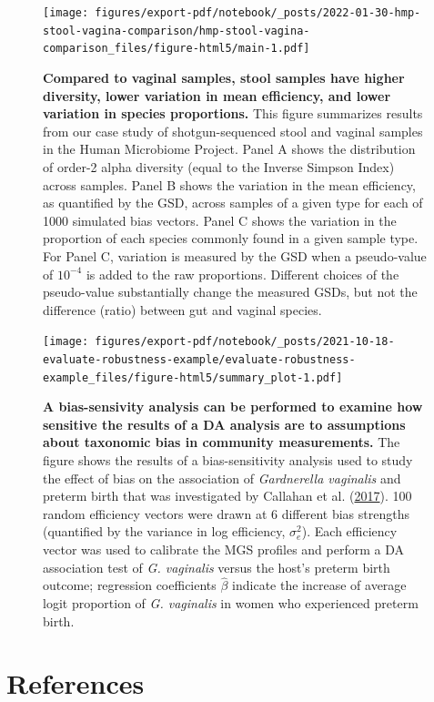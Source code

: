 \documentclass[
]{article}
\begin{document}
\begin{figure}
\centering
\texttt{[image: figures/export-pdf/notebook/\_posts/2022-01-30-hmp-stool-vagina-comparison/hmp-stool-vagina-comparison\_files/figure-html5/main-1.pdf]}
\caption{\label{fig:gut}\textbf{Compared to vaginal samples, stool samples have higher diversity, lower variation in mean efficiency, and lower variation in species proportions.} This figure summarizes results from our case study of shotgun-sequenced stool and vaginal samples in the Human Microbiome Project. Panel A shows the distribution of order-2 alpha diversity (equal to the Inverse Simpson Index) across samples. Panel B shows the variation in the mean efficiency, as quantified by the GSD, across samples of a given type for each of 1000 simulated bias vectors. Panel C shows the variation in the proportion of each species commonly found in a given sample type. For Panel C, variation is measured by the GSD when a pseudo-value of \(10^{-4}\) is added to the raw proportions. Different choices of the pseudo-value substantially change the measured GSDs, but not the difference (ratio) between gut and vaginal species.}
\end{figure}



\begin{figure}
\centering
\texttt{[image: figures/export-pdf/notebook/\_posts/2021-10-18-evaluate-robustness-example/evaluate-robustness-example\_files/figure-html5/summary\_plot-1.pdf]}
\caption{\label{fig:sensitivity-example}\textbf{A bias-sensivity analysis can be performed to examine how sensitive the results of a DA analysis are to assumptions about taxonomic bias in community measurements.} The figure shows the results of a bias-sensitivity analysis used to study the effect of bias on the association of \emph{Gardnerella vaginalis} and preterm birth that was investigated by Callahan et al. (\protect\hyperlink{ref-callahan2017repl}{2017}). 100 random efficiency vectors were drawn at 6 different bias strengths (quantified by the variance in log efficiency, \(\sigma_{e}^{2}\)). Each efficiency vector was used to calibrate the MGS profiles and perform a DA association test of \emph{G. vaginalis} versus the host's preterm birth outcome; regression coefficients \(\hat \beta\) indicate the increase of average logit proportion of \emph{G. vaginalis} in women who experienced preterm birth.}
\end{figure}



\hypertarget{references}{%
\section*{References}\label{references}}
\end{document}
